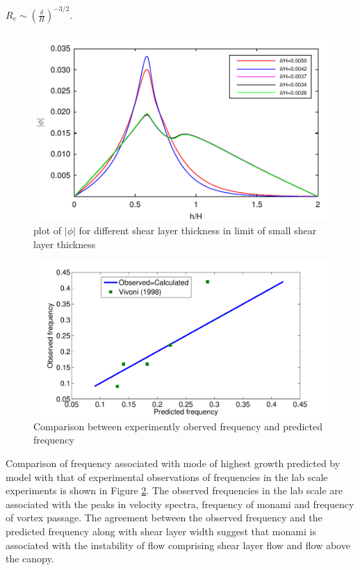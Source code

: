\documentclass[aps,prl,twocolumn,showpacs,superscriptaddress,groupedaddress,10pt]{revtex4-1}  %
\begin{document}
$R_e \sim (\frac{\delta}{H})^{-3/2}$.
\begin{figure}[]
\includegraphics[]{Asymptotic_eig_set3.pdf}
\caption{plot of $|\phi|$ for different shear layer thickness in limit of small shear layer thickness}
\label{Asymptotic_mode}
\end{figure}
\begin{figure}[htb]
\includegraphics[scale=0.34]{Observed_vs_calculated}
\caption{Comparison between experimently oberved frequency and predicted frequency}
\label{Observed_calculated}
\end{figure}
\newline
Comparison of frequency associated with mode of highest growth predicted by model with that of experimental observations of frequencies in the lab scale experiments is shown in
Figure \ref{Observed_calculated}.
The observed frequencies in the lab scale are associated with the peaks in velocity spectra, frequency of monami and frequency of vortex passage. The agreement between the observed
frequency and the predicted frequency along with shear layer width suggest that monami is associated with the instability of flow comprising shear layer flow and flow above the canopy.
\end{document}

